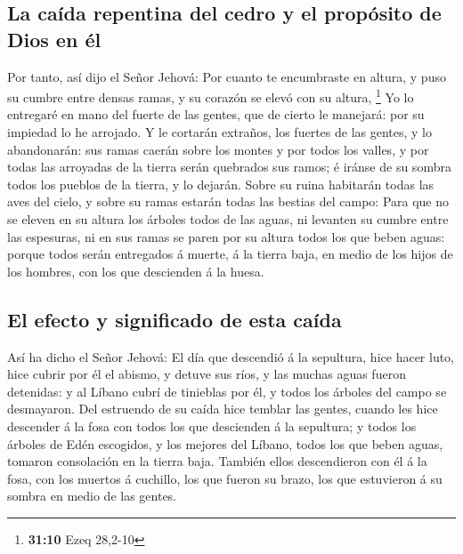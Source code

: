 \hypertarget{la-cauxedda-repentina-del-cedro-y-el-propuxf3sito-de-dios-en-uxe9l}{%
\subsection{La caída repentina del cedro y el propósito de Dios en
él}\label{la-cauxedda-repentina-del-cedro-y-el-propuxf3sito-de-dios-en-uxe9l}}

 Por tanto, así dijo el Señor Jehová: Por cuanto te
encumbraste en altura, y puso su cumbre entre densas ramas, y su corazón
se elevó con su altura, \footnote{\textbf{31:10} Ezeq 28,2-10}
 Yo lo entregaré en mano del fuerte de las gentes, que de
cierto le manejará: por su impiedad lo he arrojado.  Y le
cortarán extraños, los fuertes de las gentes, y lo abandonarán: sus
ramas caerán sobre los montes y por todos los valles, y por todas las
arroyadas de la tierra serán quebrados sus ramos; é iránse de su sombra
todos los pueblos de la tierra, y lo dejarán.  Sobre su
ruina habitarán todas las aves del cielo, y sobre su ramas estarán todas
las bestias del campo:  Para que no se eleven en su altura
los árboles todos de las aguas, ni levanten su cumbre entre las
espesuras, ni en sus ramas se paren por su altura todos los que beben
aguas: porque todos serán entregados á muerte, á la tierra baja, en
medio de los hijos de los hombres, con los que descienden á la huesa.

\hypertarget{el-efecto-y-significado-de-esta-cauxedda}{%
\subsection{El efecto y significado de esta
caída}\label{el-efecto-y-significado-de-esta-cauxedda}}

 Así ha dicho el Señor Jehová: El día que descendió á la
sepultura, hice hacer luto, hice cubrir por él el abismo, y detuve sus
ríos, y las muchas aguas fueron detenidas: y al Líbano cubrí de
tinieblas por él, y todos los árboles del campo se desmayaron.
 Del estruendo de su caída hice temblar las gentes, cuando
les hice descender á la fosa con todos los que descienden á la
sepultura; y todos los árboles de Edén escogidos, y los mejores del
Líbano, todos los que beben aguas, tomaron consolación en la tierra
baja.  También ellos descendieron con él á la fosa, con los
muertos á cuchillo, los que fueron su brazo, los que estuvieron á su
sombra en medio de las gentes.

